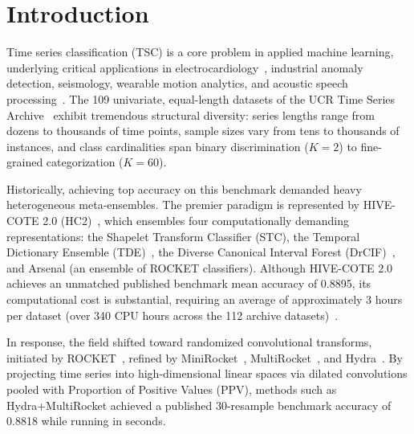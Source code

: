 \documentclass[journal,twocolumn]{article}
\begin{document}
\section{Introduction}
Time series classification (TSC) is a core problem in applied machine learning, underlying critical applications in electrocardiology~\cite{dau2019ucr}, industrial anomaly detection, seismology, wearable motion analytics, and acoustic speech processing~\cite{bagnall2017great}. The 109 univariate, equal-length datasets of the UCR Time Series Archive~\cite{dau2019ucr,dempster2021minirocket} exhibit tremendous structural diversity: series lengths range from dozens to thousands of time points, sample sizes vary from tens to thousands of instances, and class cardinalities span binary discrimination ($K=2$) to fine-grained categorization ($K=60$).

Historically, achieving top accuracy on this benchmark demanded heavy heterogeneous meta-ensembles. The premier paradigm is represented by HIVE-COTE 2.0 (HC2)~\cite{middlehurst2021hive}, which ensembles four computationally demanding representations: the Shapelet Transform Classifier (STC), the Temporal Dictionary Ensemble (TDE)~\cite{middlehurst2021scalable}, the Diverse Canonical Interval Forest (DrCIF)~\cite{middlehurst2020canonical}, and Arsenal (an ensemble of ROCKET classifiers). Although HIVE-COTE 2.0 achieves an unmatched published benchmark mean accuracy of 0.8895, its computational cost is substantial, requiring an average of approximately 3 hours per dataset (over 340 CPU hours across the 112 archive datasets)~\cite{middlehurst2021hive}.

In response, the field shifted toward randomized convolutional transforms, initiated by ROCKET~\cite{dempster2020rocket}, refined by MiniRocket~\cite{dempster2021minirocket}, MultiRocket~\cite{tan2022multirocket}, and Hydra~\cite{dempster2023hydra}. By projecting time series into high-dimensional linear spaces via dilated convolutions pooled with Proportion of Positive Values (PPV), methods such as Hydra+MultiRocket achieved a published 30-resample benchmark accuracy of 0.8818 while running in seconds.
\end{document}
